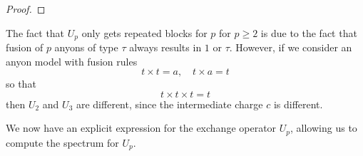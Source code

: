 \begin{proof}
\end{proof}

\begin{remark}
  The fact that $U_p$ only gets repeated blocks for $p$ for $p \ge 2$ is due to the fact that fusion of $p$ anyons of type $τ$ always results in $1$ or $τ$. However, if we consider an anyon model with fusion rules
  \begin{equation}
    t \times t = a, \quad
    t \times a = t
  \end{equation}
  so that
  \begin{equation}
    t \times t \times t = t
  \end{equation}
  then $U_2$ and $U_3$ are different, since the intermediate charge $c$ is different.
\end{remark}

We now have an explicit expression for the exchange operator $U_p$, allowing us to compute the spectrum for $U_p$.

